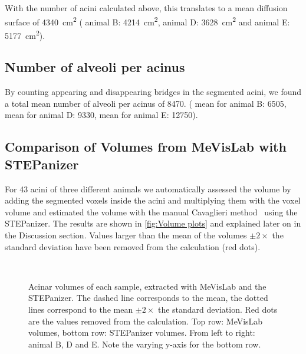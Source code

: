 \documentclass[a4paper,DIVcalc,abstract,english]{scrartcl}
\newcommand{\numberofacini}{43}
\newcommand{\biggerthan}{2} %
\newcommand{\numberofalveoliB}{6505}
\newcommand{\numberofalveoliD}{9330}
\newcommand{\numberofalveoliE}{12750}
\newcommand{\meannumberofalveoli}{8470} %
\newcommand{\airspacesurfaceB}{4214} %
\newcommand{\airspacesurfaceD}{3628} %
\newcommand{\airspacesurfaceE}{5177} %
\newcommand{\meanairspacesurface}{4340} %
\begin{document}
With the number of acini calculated above, this translates to a mean diffusion surface of \SI{\meanairspacesurface}{\centi\metre\squared} (%
animal B: \SI{\airspacesurfaceB}{\centi\metre\squared},
animal D: \SI{\airspacesurfaceD}{\centi\metre\squared} and
animal E: \SI{\airspacesurfaceE}{\centi\metre\squared}).

\subsection{Number of alveoli per acinus}
By counting appearing and disappearing bridges in the segmented acini, we found a total mean number of alveoli per acinus of \meannumberofalveoli. (%
mean for animal B: \numberofalveoliB,
mean for animal D: \numberofalveoliD,
mean for animal E: \numberofalveoliE).

\subsection{Comparison of Volumes from MeVisLab with STEPanizer}
For \numberofacini\xspace acini of three different animals we automatically assessed the volume by adding the segmented voxels inside the acini and multiplying them with the voxel volume and estimated the volume with the manual Cavaglieri method~\cite{Hsia2010} using the STEPanizer. The results are shown in \autoref{fig:Volume plots} and explained later on in the Discussion section. Values larger than the mean of the volumes \(\pm\biggerthan\times\) the standard deviation have been removed from the calculation (red dots).

\begin{figure}[htb]
	\centering
	\subfloat{
		}\hfill%
	\subfloat{
		
		}\hfill%
	\subfloat{
		
		}\\%
	\subfloat{
		
		}\hfill%
	\subfloat{
		
		}\hfill%
	\subfloat{
		
		}%
	\caption{Acinar volumes of each sample, extracted with MeVisLab and the STEPanizer. The dashed line corresponds to the mean, the dotted lines correspond to the mean \(\pm\biggerthan\times\) the standard deviation. Red dots are the values removed from the calculation. Top row: MeVisLab volumes, bottom row: STEPanizer volumes. From left to right: animal B, D and E. Note the varying y-axis for the bottom row.}
	\label{fig:Volume plots}
\end{figure}
\end{document}
